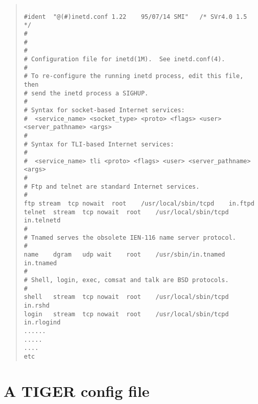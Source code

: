 \documentclass[11pt]{article}
\newcommand{\xlabel}[1]{}
\begin{document}
\begin{quote}
\begin{verbatim}

#ident	"@(#)inetd.conf	1.22	95/07/14 SMI"	/* SVr4.0 1.5	*/
#
#
#
# Configuration file for inetd(1M).  See inetd.conf(4).
#
# To re-configure the running inetd process, edit this file, then
# send the inetd process a SIGHUP.
#
# Syntax for socket-based Internet services:
#  <service_name> <socket_type> <proto> <flags> <user> <server_pathname> <args>
#
# Syntax for TLI-based Internet services:
#
#  <service_name> tli <proto> <flags> <user> <server_pathname> <args>
#
# Ftp and telnet are standard Internet services.
#
ftp	stream	tcp	nowait	root	/usr/local/sbin/tcpd	in.ftpd
telnet	stream	tcp	nowait	root	/usr/local/sbin/tcpd	in.telnetd
#
# Tnamed serves the obsolete IEN-116 name server protocol.
#
name	dgram	udp	wait	root	/usr/sbin/in.tnamed	in.tnamed
#
# Shell, login, exec, comsat and talk are BSD protocols.
#
shell	stream	tcp	nowait	root	/usr/local/sbin/tcpd	in.rshd
login	stream	tcp	nowait	root	/usr/local/sbin/tcpd	in.rlogind
......
.....
....
etc

\end{verbatim}
\end{quote}

\newpage

\section{\label{a_tiger_config.file}\xlabel{a_tiger_config.file}A TIGER config file}
\end{document}
